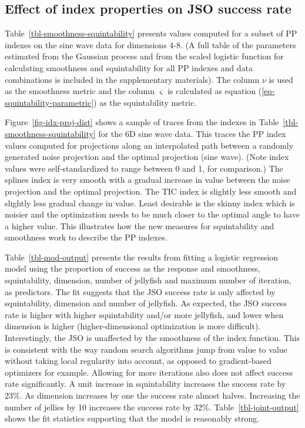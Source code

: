 \documentclass[
  12pt,
]{interact}
\theoremstyle{plain}
\begin{document}
\endgroup{}

\subsection{Effect of index properties on JSO success
rate}\label{effect-of-index-properties-on-jso-success-rate}

Table~\ref{tbl-smoothness-squintability} presents values computed for a
subset of PP indexes on the sine wave data for dimensions 4-8. (A full
table of the parameters estimated from the Gaussian process and from the
scaled logistic function for calculating smoothness and squintability
for all PP indexes and data combinations is included in the
supplementary materials). The column \(\nu\) is used as the smoothness
metric and the column \(\varsigma\) is calculated as equation
(\ref{eq-squintability-parametric}) as the squintability metric.

Figure~\ref{fig-idx-proj-dist} shows a sample of traces from the indexes
in Table~\ref{tbl-smoothness-squintability} for the 6D sine wave data.
This traces the PP index values computed for projections along an
interpolated path between a randomly generated noise projection and the
optimal projection (sine wave). (Note index values were
self-standardized to range between 0 and 1, for comparison.) The splines
index is very smooth with a gradual increase in value between the noise
projection and the optimal projection. The TIC index is slightly less
smooth and slightly less gradual change in value. Least desirable is the
skinny index which is noisier and the optimization needs to be much
closer to the optimal angle to have a higher value. This illustrates how
the new measures for squintability and smoothness work to describe the
PP indexes.

Table~\ref{tbl-mod-output} presents the results from fitting a logistic
regression model using the proportion of success as the response and
smoothness, squintability, dimension, number of jellyfish and maximum
number of iteration, as predictors. The fit suggests that the JSO
success rate is only affected by squintability, dimension and number of
jellyfish. As expected, the JSO success rate is higher with higher
squintability and/or more jellyfish, and lower when dimension is higher
(higher-dimensional optimization is more difficult). Interestingly, the
JSO is unaffected by the smoothness of the index function. This is
consistent with the way random search algorithms jump from value to
value without taking local regularity into account, as opposed to
gradient-based optimizers for example. Allowing for more iterations also
does not affect success rate significantly. A unit increase in
squintability increases the success rate by 23\%. As dimension increases
by one the success rate almost halves. Increasing the number of jellies
by 10 increases the success rate by 32\%. Table~\ref{tbl-joint-output}
shows the fit statistics supporting that the model is reasonably strong.
\end{document}
